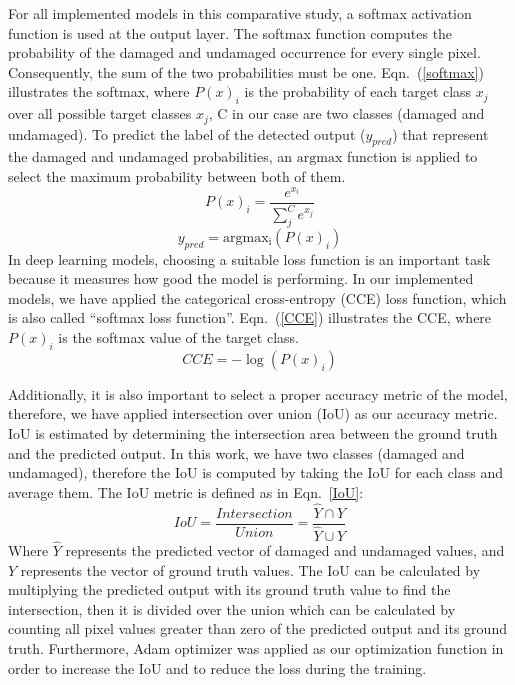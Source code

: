 \documentclass[runningheads]{llncs}
\begin{document}
For all implemented models in this comparative study, a softmax activation function is used at the output layer.
The softmax function computes the probability of the damaged and undamaged occurrence for every single pixel.
Consequently, the sum of the two probabilities must be one. 
Eqn.~(\ref{softmax}) illustrates the softmax, where \(P(x)_{i}\) is the probability of each target class \(x_{j}\) over all possible target classes \(x_{j}\), C in our case are two classes  (damaged and undamaged).
To predict the label of the detected output (\(y_{pred}\)) that represent the damaged and undamaged probabilities, an \(\mathrm{argmax}\) function is applied to select the maximum probability between both of them.
\begin{equation}
	P(x)_{i} = \frac{e^{x_{i}}}{\sum_{j}^{C} e^{x_{j}}}
	\label{softmax}
\end{equation} 
\begin{equation}
	y_{pred} = \mathrm{argmax_{i}}\left( P(x)_{i} \right)
	\label{argmax}
\end{equation}
In deep learning models, choosing a suitable loss function is an important task because it measures how good the model is performing.
In our implemented models, we have applied the categorical cross-entropy (CCE) loss function, which is also called \enquote{softmax loss function}.
Eqn.~(\ref{CCE}) illustrates the CCE, where \( P(x)_{i}\) is the softmax value of the target class. 
\begin{equation}
	CCE = -\log\left( P(x)_{i} \right)
	\label{CCE}
\end{equation}

Additionally, it is also important to select a proper accuracy metric of the model, therefore, we have applied intersection over union (IoU) as our accuracy metric. 
IoU is estimated by determining the intersection area between the ground truth and the predicted output.
In this work, we have two classes (damaged and undamaged), therefore the IoU is computed by taking the IoU for each class and average them.
The IoU metric is defined as in Eqn.~\ref{IoU}:
\begin{equation}
	IoU = \frac{Intersection}{Union} = \frac{\hat{Y} \cap Y}{\hat{Y} \cup Y} 
	\label{IoU}
\end{equation}
Where \(\hat{Y}\) represents the predicted vector of damaged and undamaged values, and \(Y\) represents the vector of ground truth values.
The IoU can be calculated by multiplying the predicted output with its ground truth value to find the intersection, then it is divided over the union which can be calculated by counting all pixel values greater than zero of the predicted output and its ground truth.
Furthermore, Adam optimizer was applied as our optimization function in order to increase the IoU and to reduce the loss during the training.
\end{document}
